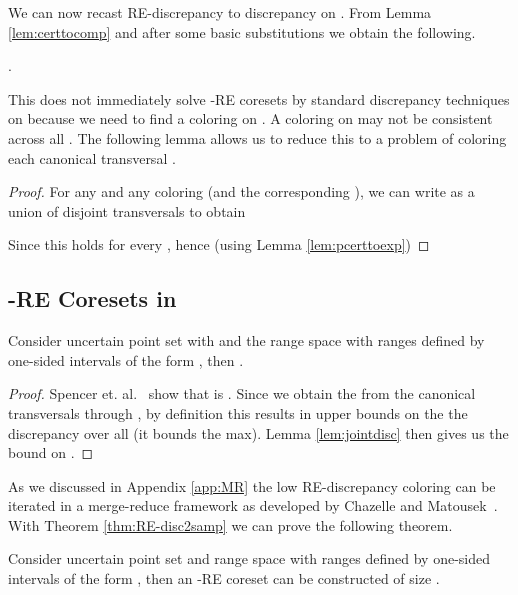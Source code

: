 \documentclass[11pt]{myclass}
\newcommand{\RE}{\textsf{RE}\xspace}
\begin{document}
We can now recast \RE-discrepancy to discrepancy on . From  Lemma \ref{lem:certtocomp} 
 and
after some basic substitutions we obtain the following.  

\begin{lemma}\label{lem:pcerttoexp}
.
\end{lemma}


This does not immediately solve -\RE coresets by standard discrepancy  techniques on  because we need to find a coloring  on .  A coloring  on  may not be consistent across all .
The following lemma allows us to reduce this to a problem of coloring each canonical transversal .  



\begin{lemma}\label{lem:jointdisc}

\end{lemma} 
\begin{proof}
For any  and any coloring  (and the corresponding ), we can write  as a union of disjoint transversals  to obtain 

Since this holds for every , hence (using Lemma \ref{lem:pcerttoexp})

\end{proof}


\subsection{-\RE Coresets in }
\label{subsec:1dre}
\begin{lemma}\label{lowdis}
Consider uncertain point set  with  and the range space  with ranges defined by one-sided intervals of the form , then .
 \end{lemma}
\begin{proof}
 Spencer et. al.~\cite{spencer} show that  is .   Since we obtain the  from the canonical transversals  through , by definition this results in upper bounds on the the discrepancy over all  (it bounds the max). Lemma \ref{lem:jointdisc} then gives us the bound on .
\end{proof} 

As we discussed in Appendix \ref{app:MR} the low \RE-discrepancy coloring can be iterated in a merge-reduce framework as developed by Chazelle and Matousek~\cite{CM96}.   With Theorem \ref{thm:RE-disc2samp} we can prove the following theorem.  

\begin{theorem}\label{thm:1deps-RE}
Consider uncertain point set  and range space  with ranges defined by one-sided intervals of the form , 
then an -\RE coreset can be constructed of size .
 \end{theorem}
\end{document}
